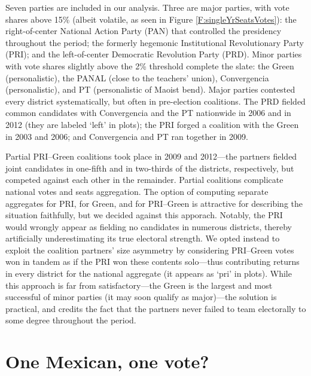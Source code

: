 \documentclass[letter,12pt]{article}
\begin{document}
Seven parties are included in our analysis. Three are major parties, with vote shares above 15\% (albeit volatile, as seen in Figure \ref{F:singleYrSeatsVotes}): the right-of-center National Action Party (PAN) that controlled the presidency throughout the period; the formerly hegemonic Institutional Revolutionary Party (PRI); and the left-of-center Democratic Revolution Party (PRD). Minor parties with vote shares slightly above the 2\% threshold complete the slate: the Green (personalistic), the PANAL (close to the teachers' union), Convergencia (personalistic), and PT (personalistic of Maoist bend). Major parties contested every district systematically, but often in pre-election coalitions. The PRD fielded common candidates with Convergencia and the PT nationwide in 2006 and in 2012 (they are labeled `left' in plots); the PRI forged a coalition with the Green in 2003 and 2006; and Convergencia and PT ran together in 2009. 

Partial PRI--Green coalitions took place in 2009 and 2012---the partners fielded joint candidates in one-fifth and in two-thirds of the districts, respectively, but competed against each other in the remainder. Partial coalitions complicate national votes and seats aggregation. The option of computing separate aggregates for PRI, for Green, and for PRI--Green is attractive for describing the situation faithfully, but we decided against this apporach. Notably, the PRI would wrongly appear as fielding no candidates in numerous districts, thereby artificially underestimating its true electoral strength. We opted instead to exploit the coalition partners' size asymmetry by considering PRI--Green votes won in tandem as if the PRI won these contents solo---thus contributing returns in every district for the national aggregate (it appears as `pri' in plots). While this approach is far from satisfactory---the Green is the largest and most successful of minor parties (it may soon qualify as major)---the solution is practical, and credits the fact that the partners never failed to team electorally to some degree throughout the period. 

\section{One Mexican, one vote?}

\end{document}
